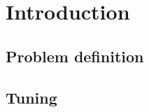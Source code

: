\chapter{Introduction}\label{ch:introduction}


\section{Problem definition}\label{sec:problem-definition}

\section{Tuning}\label{sec:tuning}
